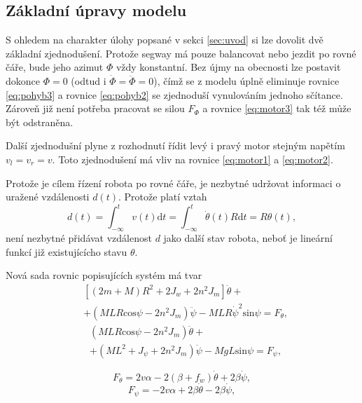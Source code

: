 \documentclass[conference]{IEEEtran}
\begin{document}
\subsection{Základní úpravy modelu}
S ohledem na charakter úlohy popsané v sekci \ref{sec:uvod} si lze dovolit dvě základní zjednodušení. Protože segway
má pouze balancovat nebo jezdit po rovné čáře, bude jeho azimut $\varPhi$ vždy konstantní. 
Bez újmy na obecnosti lze postavit dokonce $\varPhi = 0$ (odtud i $\dot{\varPhi} = \ddot{\varPhi} = 0$),
čímž se z modelu úplně eliminuje rovnice \eqref{eq:pohyb3}
a rovnice \eqref{eq:pohyb2} se zjednoduší vynulováním jednoho sčítance. Zároveň již není potřeba pracovat se silou $F_\varPhi$
a rovnice \eqref{eq:motor3} tak též může být odstraněna.

Další zjednodušní plyne z rozhodnutí řídit levý i pravý motor stejným napětím $v_l = v_r = v$.
Toto zjednodušení má vliv na rovnice \eqref{eq:motor1} a \eqref{eq:motor2}.

Protože je cílem řízení robota po rovné čáře, je nezbytné udržovat informaci o uražené vzdálenosti $d(t)$.
Protože platí vztah 
\begin{equation}
    d(t) = \int_{-\infty}^t v(t) \text{d}t = \int_ {-\infty}^t \dot{\theta}(t) R \text{d}t = R \theta(t),
    \label{eq:vzdalenost}
\end{equation}
není nezbytné přidávat vzdálenost $d$ jako další stav robota, neboť je lineární funkcí již existujícícho stavu $\theta$.

Nová sada rovnic popisujících systém má tvar
\begin{equation}
    \begin{aligned}
        &\left[(2m + M) R^2 + 2 J_w + 2n^2 J_m\right] \ddot{\theta} + \\
        &+ (MLR \text{cos} \psi - 2n^2 J_m) \ddot{\psi} - MLR\dot{\psi}^2 \text{sin} \psi = F_\theta,
    \end{aligned}
    \label{eq:pohyb1_easy}
\end{equation}
\begin{equation}
    \begin{aligned}
        & (MLR \text{cos} \psi - 2n^2 J_m) \ddot{\theta} + \\
        & + (ML^2 + J_\psi + 2n^2 J_m) \ddot{\psi} - MgL\text{sin}\psi = F_\psi,
    \end{aligned}
    \label{eq:pohyb2_easy}
\end{equation}

\begin{equation}
    F_\theta = 2v \alpha - 2(\beta + f_w) \dot{\theta} + 2\beta\dot{\psi},
    \label{eq:motor1_easy}
\end{equation}
\begin{equation}
    F_\psi = - 2v \alpha + 2\beta \dot{\theta} - 2\beta \dot{\psi},
    \label{eq:motor2_easy}
\end{equation}
\end{document}
